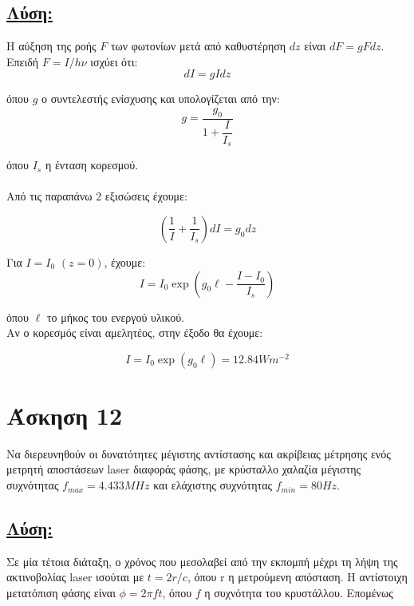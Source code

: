 \documentclass[a4paper,11pt,titlepage]{article}
\begin{document}
\subsection*{\underline{Λύση:}}

Η αύξηση της ροής $F$ των φωτονίων μετά από καθυστέρηση $dz$ είναι $dF=gFdz$. Επειδή $F=I/h\nu$ ισχύει ότι:
\begin{equation}
 dI=gIdz
\end{equation}

όπου $g$ ο συντελεστής ενίσχυσης και υπολογίζεται από την:
\begin{equation}
 g=\frac{g_0}{1+\dfrac{I}{I_s}}
\end{equation}

όπου $I_s$ η ένταση κορεσμού.
\\\\
Από τις παραπάνω 2 εξισώσεις έχουμε:

\begin{equation}
(\dfrac{1}{I}+\dfrac{1}{I_s})dI=g_0dz
\end{equation}

Για $I=I_0$ $(z=0)$, έχουμε:
\begin{equation}
 I=I_0\exp ( g_0\ell-\dfrac{I-I_0}{I_s} )
\end{equation}

όπου $\ell$ το μήκος του ενεργού υλικού. \\
Αν ο κορεσμός είναι αμελητέος, στην έξοδο θα έχουμε:

\begin{equation}
 I=I_0\exp(g_0\ell)=12.84Wm^{-2}
\end{equation}


\section{Άσκηση 12}

Να διερευνηθούν οι δυνατότητες μέγιστης αντίστασης και ακρίβειας μέτρησης ενός μετρητή αποστάσεων laser διαφοράς φάσης, με κρύσταλλο χαλαζία μέγιστης συχνότητας $f_{max}=4.433MHz$ και ελάχιστης συχνότητας $f_{min}=80Hz$.

\subsection*{\underline{Λύση:}}

Σε μία τέτοια διάταξη, ο χρόνος που μεσολαβεί από την εκπομπή μέχρι τη λήψη της ακτινοβολίας laser ισούται με $t=2r/c$, όπου r η μετρούμενη απόσταση. Η αντίστοιχη μετατόπιση φάσης είναι $\phi=2\pi ft$, όπου $f$ η συχνότητα του κρυστάλλου. Επομένως
\end{document}

